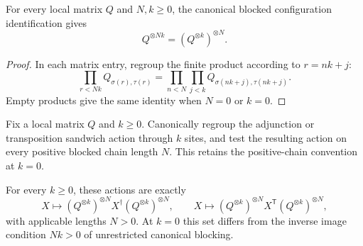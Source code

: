 \begin{lemma}
    \label{lem:mpu_sitewise_matrix_regrouping}
    \leanok
    For every local matrix $Q$ and $N,k\geq0$, the canonical blocked
    configuration identification gives
    \[
        Q^{\otimes Nk}=(Q^{\otimes k})^{\otimes N}.
    \]
\end{lemma}

\begin{proof}\leanok
    In each matrix entry, regroup the finite product according to
    $r=nk+j$:
    \[
        \prod_{r<Nk}Q_{\sigma(r),\tau(r)}
        =\prod_{n<N}\prod_{j<k}Q_{\sigma(nk+j),\tau(nk+j)}.
    \]
    Empty products give the same identity when $N=0$ or $k=0$.
\end{proof}

\begin{definition}
    \label{def:mpu_blocked_physical_positive_actions}
    \leanok
    Fix a local matrix $Q$ and $k\geq0$. Canonically regroup the
    adjunction or transposition sandwich action through $k$ sites,
    and test the resulting action on every positive blocked chain
    length $N$. This retains the positive-chain convention at $k=0$.
\end{definition}

\begin{lemma}
    \label{lem:mpu_blocked_physical_positive_action_identities}
    \leanok
    For every $k\geq0$, these actions are exactly
    \[
        X\longmapsto (Q^{\otimes k})^{\otimes N}
        X^\dagger (Q^{\otimes k})^{\otimes N},
        \qquad
        X\longmapsto (Q^{\otimes k})^{\otimes N}
        X^{\mathsf T}(Q^{\otimes k})^{\otimes N},
    \]
    with applicable lengths $N>0$. At $k=0$ this set differs from
    the inverse image condition $Nk>0$ of unrestricted canonical blocking.
\end{lemma}

